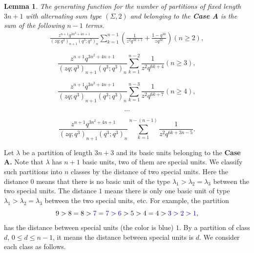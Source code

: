 \documentclass[draft]{amsart}
\numberwithin{equation}{section}
\theoremstyle{plain}
\newtheorem{lemma}[theorem]{Lemma}
\theoremstyle{remark}
\begin{document}
\begin{lemma}\label{Lemma 3.6}
The generating function for the number of partitions of fixed length $3n+1$ with alternating sum type $(\Sigma, 2)$ and belonging to the \textbf{Case A} is the sum of the following $n-1$ terms. 
\begin{align}\tag{0}\label{3.6-0}
\frac{z^{n+1}q^{3n^{2}+4n+1}}{(zq;q^{3})_{n+1}(q^{3};q^{3})_{n}}
\sum_{k=1} ^{n-1}\left(\frac{1}{z^{2}q^{3k+1}}+\frac{1-q^{3k}}{zq^{3k}}\right)(n\geq2),
\end{align}



\begin{equation}\tag{1}
\frac{z^{n+1}q^{3n^{2}+4n+1}}{(zq;q^{3})_{n+1}(q^{3};q^{3})_{n}}\sum_{k=1} ^{n-2}\frac{1}{z^{2}q^{6k+4}}(n\geq 3),
\end{equation}



\begin{equation}\tag{2}
\frac{z^{n+1}q^{3n^{2}+4n+1}}{(zq;q^{3})_{n+1}(q^{3};q^{3})_{n}}\sum_{k=1} ^{n-3}\frac{1}{z^{2}q^{6k+7}}(n\geq 4),
\end{equation}

\begin{equation*}
\dots
\end{equation*}


\begin{equation}\tag{n-2}\label{3.6-n-2}
\frac{z^{n+1}q^{3n^{2}+4n+1}}{(zq;q^{3})_{n+1}(q^{3};q^{3})_{n}}\sum_{k=1} ^{n-(n-1)}\frac{1}{z^{2}q^{6k+3n-5}}.
\end{equation}



\end{lemma}
Let $\lambda$ be a partition of length $3n+3$ and its basic units belonging to the \textbf{Case A.} Note that $\lambda$ has $n+1$ basic units, two of them are special units. We classify such partitions into $n$ classes by the distance of two special units. Here the distance $0$ means that there is no basic unit of the type $\lambda_{1}>\lambda_{2}=\lambda_{3}$ between the two special units. The distance $1$ means there is only one basic unit of type $\lambda_{1}>\lambda_{2}=\lambda_{3}$ between the two special units, etc. For example, the partition
$$
9>8=8>{\color{blue}7=7>6}>5>4=4>{\color{blue}3>2>1},
$$
has the distance between special units (the color is blue) $1$. By a partition of class $d$, $0\leq d\leq n-1$, it means the distance between special units is $d$. We consider each class as follows.
\end{document}
